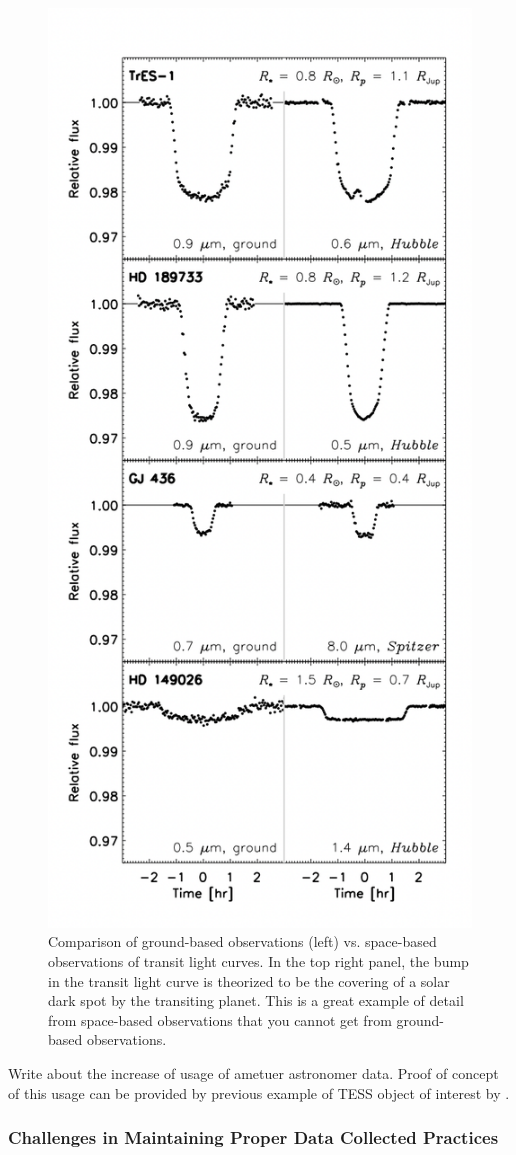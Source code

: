 \documentclass[oneside,12pt]{amsart}
\numberwithin{page}{section}
\begin{document}
\begin{figure}
    \centering
    \includegraphics[width=0.5\linewidth]{figs/winn_fig8.png}
    \caption{Comparison of ground-based observations (left) vs. space-based observations of transit light curves. In the top right panel, the bump in the transit light curve is theorized to be the covering of a solar dark spot by the transiting planet. This is a great example of detail from space-based observations that you cannot get from ground-based observations.}
    \label{fig:winn-fig8}
\end{figure}

Write about the increase of usage of ametuer astronomer data. Proof of concept of this usage can be provided by previous example of TESS object of interest by \citep{sgro2024confirmation}. 


\subsubsection{Challenges in Maintaining Proper Data Collected Practices}

\end{document}
